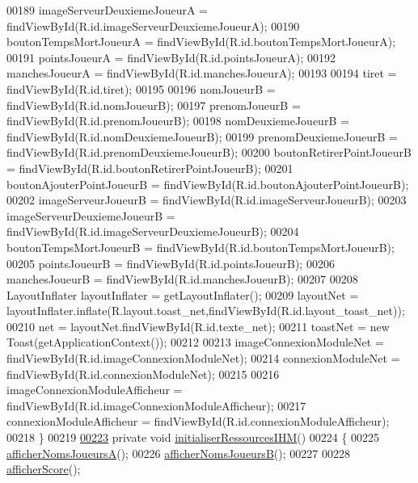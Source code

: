 \begin{DoxyCode}
00189         imageServeurDeuxiemeJoueurA = findViewById(R.id.imageServeurDeuxiemeJoueurA);
00190         boutonTempsMortJoueurA = findViewById(R.id.boutonTempsMortJoueurA);
00191         pointsJoueurA = findViewById(R.id.pointsJoueurA);
00192         manchesJoueurA = findViewById(R.id.manchesJoueurA);
00193 
00194         tiret = findViewById(R.id.tiret);
00195 
00196         nomJoueurB = findViewById(R.id.nomJoueurB);
00197         prenomJoueurB = findViewById(R.id.prenomJoueurB);
00198         nomDeuxiemeJoueurB = findViewById(R.id.nomDeuxiemeJoueurB);
00199         prenomDeuxiemeJoueurB = findViewById(R.id.prenomDeuxiemeJoueurB);
00200         boutonRetirerPointJoueurB = findViewById(R.id.boutonRetirerPointJoueurB);
00201         boutonAjouterPointJoueurB = findViewById(R.id.boutonAjouterPointJoueurB);
00202         imageServeurJoueurB = findViewById(R.id.imageServeurJoueurB);
00203         imageServeurDeuxiemeJoueurB = findViewById(R.id.imageServeurDeuxiemeJoueurB);
00204         boutonTempsMortJoueurB = findViewById(R.id.boutonTempsMortJoueurB);
00205         pointsJoueurB = findViewById(R.id.pointsJoueurB);
00206         manchesJoueurB = findViewById(R.id.manchesJoueurB);
00207 
00208         LayoutInflater layoutInflater = getLayoutInflater();
00209         layoutNet = layoutInflater.inflate(R.layout.toast\_net,findViewById(R.id.layout\_toast\_net));
00210         net = layoutNet.findViewById(R.id.texte\_net);
00211         toastNet = \textcolor{keyword}{new} Toast(getApplicationContext());
00212 
00213         imageConnexionModuleNet = findViewById(R.id.imageConnexionModuleNet);
00214         connexionModuleNet = findViewById(R.id.connexionModuleNet);
00215 
00216         imageConnexionModuleAfficheur = findViewById(R.id.imageConnexionModuleAfficheur);
00217         connexionModuleAfficheur = findViewById(R.id.connexionModuleAfficheur);
00218     \}
00219 
\hyperlink{classcom_1_1example_1_1area_1_1_i_h_m_gestion_partie_a7d67797752c3b0f4e0cab951c8e11e8d}{00223}     \textcolor{keyword}{private} \textcolor{keywordtype}{void} \hyperlink{classcom_1_1example_1_1area_1_1_i_h_m_gestion_partie_a7d67797752c3b0f4e0cab951c8e11e8d}{initialiserRessourcesIHM}()
00224     \{
00225         \hyperlink{classcom_1_1example_1_1area_1_1_i_h_m_gestion_partie_adf3bc699cb45da1f1dea4cb5e16e74f3}{afficherNomsJoueursA}();
00226         \hyperlink{classcom_1_1example_1_1area_1_1_i_h_m_gestion_partie_a55e51d83d01ea0c3c6400f6419edfd06}{afficherNomsJoueursB}();
00227 
00228         \hyperlink{classcom_1_1example_1_1area_1_1_i_h_m_gestion_partie_a42cce9ee62fd37d687d4a194328aac70}{afficherScore}();

\end{DoxyCode}
